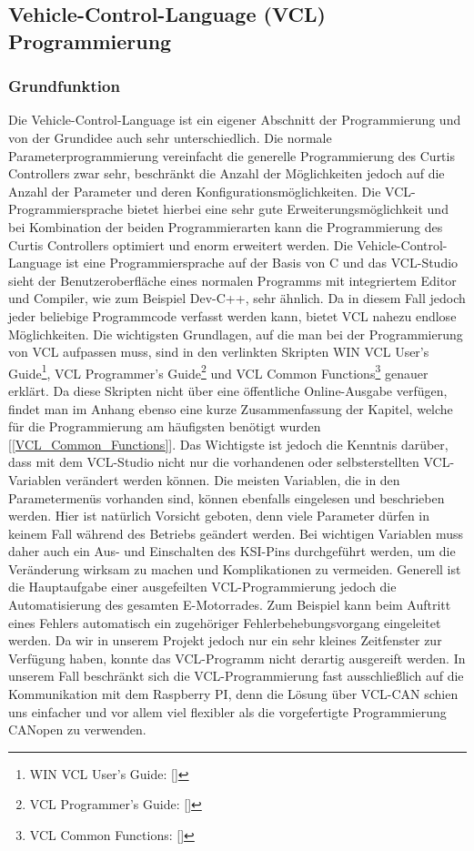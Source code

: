 \subsection{Vehicle-Control-Language (VCL) Programmierung}
\label{VCL}
\subsubsection{Grundfunktion}
Die Vehicle-Control-Language ist ein eigener Abschnitt der Programmierung und von der Grundidee auch sehr unterschiedlich. Die normale Parameterprogrammierung vereinfacht die generelle Programmierung des Curtis Controllers zwar sehr, beschränkt die Anzahl der Möglichkeiten jedoch auf die Anzahl der Parameter und deren Konfigurationsmöglichkeiten. Die VCL-Programmiersprache bietet hierbei eine sehr gute Erweiterungsmöglichkeit und bei Kombination der beiden Programmierarten kann die Programmierung des Curtis Controllers optimiert und enorm erweitert werden. Die Vehicle-Control-Language ist eine Programmiersprache auf der Basis von C und das VCL-Studio sieht der Benutzeroberfläche eines normalen Programms mit integriertem Editor und Compiler, wie zum Beispiel Dev-C++, sehr ähnlich. Da in diesem Fall jedoch jeder beliebige Programmcode verfasst werden kann, bietet VCL nahezu endlose Möglichkeiten. Die wichtigsten Grundlagen, auf die man bei der Programmierung von VCL aufpassen muss, sind in den verlinkten Skripten \glqq WIN VCL User's Guide\grqq{}\footnote{WIN VCL User's Guide: [\cite{WIN_VCL}]}, \glqq VCL Programmer's Guide\grqq{}\footnote{VCL Programmer's Guide: [\cite{VCL_Programmer}]} und \glqq VCL Common Functions\grqq{}\footnote{VCL Common Functions: [\cite{VCL_Common_Functions}]} genauer erklärt. Da diese Skripten nicht über eine öffentliche Online-Ausgabe verfügen, findet man im Anhang ebenso eine kurze Zusammenfassung der Kapitel, welche für die Programmierung am häufigsten benötigt wurden [\ref{VCL_Common_Functions}]. Das Wichtigste ist jedoch die Kenntnis darüber, dass mit dem VCL-Studio nicht nur die vorhandenen oder selbsterstellten VCL-Variablen verändert werden können. Die meisten Variablen, die in den Parametermenüs vorhanden sind, können ebenfalls eingelesen und beschrieben werden. Hier ist natürlich Vorsicht geboten, denn viele Parameter dürfen in keinem Fall während des Betriebs geändert werden. Bei wichtigen Variablen muss daher auch ein Aus- und Einschalten des KSI-Pins durchgeführt werden, um die Veränderung wirksam zu machen und Komplikationen zu vermeiden. Generell ist die Hauptaufgabe einer ausgefeilten VCL-Programmierung jedoch die Automatisierung des gesamten E-Motorrades. Zum Beispiel kann beim Auftritt eines Fehlers automatisch ein zugehöriger Fehlerbehebungsvorgang eingeleitet werden. Da wir in unserem Projekt jedoch nur ein sehr kleines Zeitfenster zur Verfügung haben, konnte das VCL-Programm nicht derartig ausgereift werden. In unserem Fall beschränkt sich die VCL-Programmierung fast ausschließlich auf die Kommunikation mit dem Raspberry PI, denn die Lösung über VCL-CAN schien uns einfacher und vor allem viel flexibler als die vorgefertigte Programmierung \glqq CANopen\grqq{} zu verwenden. 

